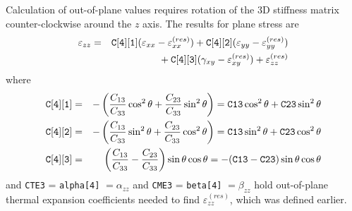 \documentclass[11pt]{article}
\def\a#1{\alpha_{#1}}
\def\b#1{\beta_{#1}}
\def\code#1{{\small\tt #1}}
\def\e#1{\varepsilon_{#1}}
\def\er#1{\varepsilon_{#1}^{(res)}}
\def\g#1{\gamma_{#1}}
\begin{document}
Calculation of out-of-plane values requires rotation of the 3D stiffness matrix counter-clockwise around the $z$ axis. The results for plane stress are
\begin{eqnarray}
     \e{zz} & = & \code{C[4][1]} (\e{xx} - \er{xx}) +  \code{C[4][2]}(\e{yy} -\er{yy}) 
     \nonumber \\
     && \qquad\qquad\mbox{}
                 + \code{C[4][3]}(\g{xy}-\er{xy})  + \er{zz}
\end{eqnarray}
where 
\begin{eqnarray}
 \code{C[4][1]} & = &-\left({C_{13}\over C_{33}}\cos^2\theta + {C_{23}\over C_{33}}\sin^2\theta\right)
        = \code{C13}\cos^2\theta + \code{C23}\sin^2\theta  \\
 \code{C[4][2]} & = &-\left({C_{13}\over C_{33}}\sin^2\theta + {C_{23}\over C_{33}}\cos^2\theta\right)
        = \code{C13}\sin^2\theta + \code{C23}\cos^2\theta  \\
 \code{C[4][3]} & = &  \left({C_{13}\over C_{33}} - {C_{23}\over C_{33}}\right)\sin\theta\cos\theta
        = -(\code{C13}-\code{C23})\sin\theta\cos\theta
\end{eqnarray}
and \code{CTE3} = \code{alpha[4]} $=\a{zz}$ and \code{CME3} = \code{beta[4]} $=\b{zz}$ hold out-of-plane thermal expansion coefficients needed to find $\er{zz}$, which was defined earlier.
\end{document}
